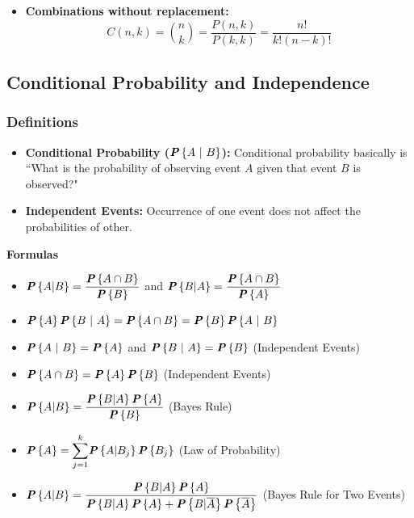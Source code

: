 \begin{multicols}{2}
\begin{itemize}
    \item \textbf{Combinations without replacement:}
        \begin{equation*}
            C(n,k) = \binom{n}{k} = \dfrac{P(n,k)}{P(k,k)} = \dfrac{n!}{k! (n - k)!}
        \end{equation*}
\end{itemize} 


\subsection{Conditional Probability and Independence}

\subsubsection*{Definitions}

\begin{itemize}
    \item \textbf{Conditional Probability ($\prob{A\ |\ B}$):} Conditional probability basically is ``What is the probability of observing event $A$ given that event $B$ is observed?"
    \item \textbf{Independent Events:} Occurrence of one event does not affect the probabilities of other.
\end{itemize}

\noindent \textbf{Formulas}
\begin{itemize}
    \item $\prob{A|B} = \dfrac{\prob{A \cap B}}{\prob{B}}$ and $\prob{B|A} = \dfrac{\prob{A \cap B}}{\prob{A}}$
    \item $\prob{A} \prob{B\ |\ A} = \prob{A \cap B} = \prob{B} \prob{A\ |\ B}$
    \item $\prob{A\ |\ B} = \prob{A}$ and $\prob{B\ |\ A} = \prob{B}$ (Independent Events)
    \item $\prob{A \cap B} = \prob{A} \prob{B}$ (Independent Events)
    \item $\prob{A|B} = \dfrac{\prob{B|A} \prob{A}}{\prob{B}}$ (Bayes Rule)
    \item $\prob{A} = \dsum_{j = 1}^{k} \prob{A|B_j} \prob{B_j}$ (Law of Probability)
    \item $\prob{A|B} = \dfrac{\prob{B|A} \prob{A}}{\prob{B|A} \prob{A} + \prob{B|\overline{A}} \prob{\overline{A}}}$ (Bayes Rule for Two Events)
\end{itemize}
\end{multicols}
